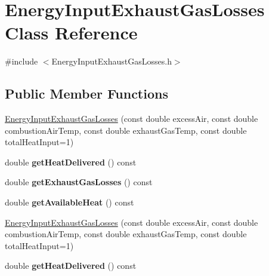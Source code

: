 \hypertarget{class_energy_input_exhaust_gas_losses}{}\section{Energy\+Input\+Exhaust\+Gas\+Losses Class Reference}
\label{class_energy_input_exhaust_gas_losses}


{\ttfamily \#include $<$Energy\+Input\+Exhaust\+Gas\+Losses.\+h$>$}

\subsection*{Public Member Functions}
\begin{DoxyCompactItemize}
\item 
\hyperlink{class_energy_input_exhaust_gas_losses_ab61da88b40504e71d2907ed8d997df85}{Energy\+Input\+Exhaust\+Gas\+Losses} (const double excess\+Air, const double combustion\+Air\+Temp, const double exhaust\+Gas\+Temp, const double total\+Heat\+Input=1)
\item 
\mbox{\label{class_energy_input_exhaust_gas_losses_a139f89d11cb663632ee9ccc27e242b07}} 
double {\bfseries get\+Heat\+Delivered} () const
\item 
\mbox{\label{class_energy_input_exhaust_gas_losses_aff089e129d329769d895e489928eb059}} 
double {\bfseries get\+Exhaust\+Gas\+Losses} () const
\item 
\mbox{\label{class_energy_input_exhaust_gas_losses_ac1e7691e1b6ce514d242faf806590179}} 
double {\bfseries get\+Available\+Heat} () const
\item 
\hyperlink{class_energy_input_exhaust_gas_losses_ab61da88b40504e71d2907ed8d997df85}{Energy\+Input\+Exhaust\+Gas\+Losses} (const double excess\+Air, const double combustion\+Air\+Temp, const double exhaust\+Gas\+Temp, const double total\+Heat\+Input=1)
\item 
\mbox{\label{class_energy_input_exhaust_gas_losses_a139f89d11cb663632ee9ccc27e242b07}} 
double {\bfseries get\+Heat\+Delivered} () const
\item 
\mbox{\label{class_energy_input_exhaust_gas_losses_aff089e129d329769d895e489928eb059}} 

\end{DoxyCompactItemize}
